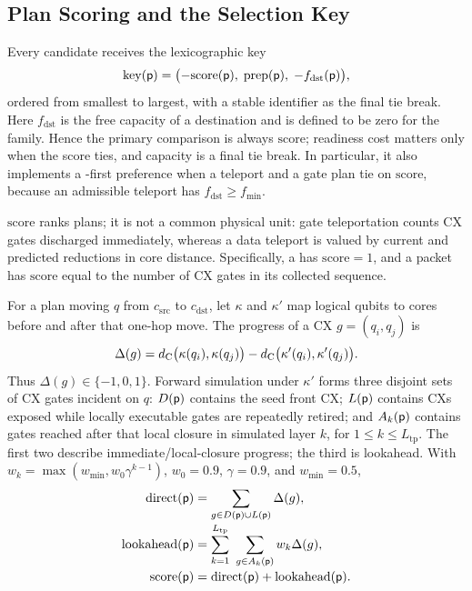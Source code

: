 \subsection{Plan Scoring and the Selection Key}
\label{sec:sfc-scoring}

Every candidate receives the lexicographic key
\begin{equation}
\mathrm{key}(\mathsf{p})=
\bigl(-\mathrm{score}(\mathsf{p}),\;\mathrm{prep}(\mathsf{p}),\;-f_\mathrm{dst}(\mathsf{p})\bigr),
\label{eq:sfc-key}
\end{equation}
ordered from smallest to largest, with a stable identifier as the final tie
break.  Here $f_\mathrm{dst}$ is the free capacity of a \TeleData{}
destination and is defined to be zero for the \TeleGate{} family.  Hence the
primary comparison is always $\mathrm{score}$; readiness cost matters only
when the score ties, and capacity is a final tie break.  In particular, it also
implements a \TeleData{}-first preference when a teleport and a gate plan
tie on $\mathrm{score}$, because an admissible teleport has
$f_\mathrm{dst}\ge f_\mathrm{min}$.

$\mathrm{score}$ ranks plans; it is not a common physical unit: gate
teleportation counts CX gates discharged immediately, whereas a data teleport
is valued by current and predicted reductions in core distance.  Specifically,
a \TeleGate{} has $\mathrm{score}=1$, and a packet has $\mathrm{score}$
equal to the number of CX gates in its collected sequence.

For a \TeleData{} plan moving $q$ from $c_\mathrm{src}$ to
$c_\mathrm{dst}$, let $\kappa$ and $\kappa'$ map logical qubits to cores
before and after that one-hop move.  The progress of a CX $g=(q_i,q_j)$ is
\begin{equation}
\Delta(g)=d_{\mathrm{C}}\bigl(\kappa(q_i),\kappa(q_j)\bigr)-
d_{\mathrm{C}}\bigl(\kappa'(q_i),\kappa'(q_j)\bigr).
\end{equation}
Thus $\Delta(g)\in\{-1,0,1\}$.  Forward simulation under $\kappa'$ forms
three disjoint sets of CX gates incident on $q$: $D(\mathsf{p})$ contains the
seed front CX; $L(\mathsf{p})$ contains CXs exposed while locally executable
gates are repeatedly retired; and $A_k(\mathsf{p})$ contains gates reached after
that local closure in simulated layer $k$, for $1\le k\le L_\mathrm{tp}$.
The first two describe immediate/local-closure progress; the third is
lookahead.  With
$w_k=\max(w_\mathrm{min},w_0\gamma^{k-1})$,
$w_0=0.9$, $\gamma=0.9$, and $w_\mathrm{min}=0.5$,
\begin{align}
\mathrm{direct}(\mathsf{p})&=
 \sum_{g\in D(\mathsf{p})\cup L(\mathsf{p})}\Delta(g),\\[-2pt]
\mathrm{lookahead}(\mathsf{p})&=
 \sum_{k=1}^{L_\mathrm{tp}}\ \sum_{g\in A_k(\mathsf{p})}w_k\Delta(g),
\nonumber\\[-2pt]
\mathrm{score}(\mathsf{p})&=
 \mathrm{direct}(\mathsf{p})+\mathrm{lookahead}(\mathsf{p}).
\nonumber
\end{align}

